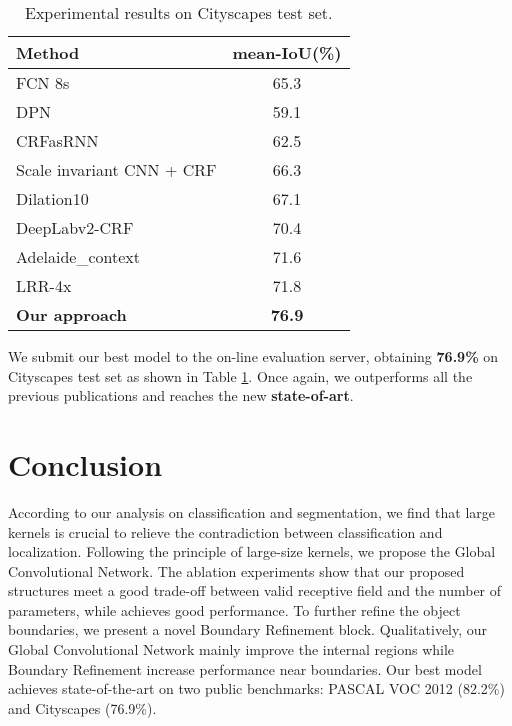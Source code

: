 \documentclass[10pt,twocolumn,letterpaper]{article}
\begin{document}
      \begin{table}[t]
      \begin{center}
         \begin{tabular}{l|c}
            \hline
            Method & mean-IoU(\%) \\
            \hline
            FCN 8s \cite{shelhamer2016fully} & 65.3 \\
            \hline
            DPN \cite{liu2015semantic} & 59.1 \\
            CRFasRNN \cite{zheng2015conditional} & 62.5 \\
            Scale invariant CNN + CRF \cite{krevso2016convolutional} & 66.3 \\
            Dilation10 \cite{yu2015multi} &  67.1 \\
            DeepLabv2-CRF \cite{chen2016deeplab} & 70.4 \\
            Adelaide\_context \cite{Lin_2016_CVPR} & 71.6 \\
            LRR-4x \cite{ghiasi2016laplacian} & 71.8   \\
            \hline 
            \textbf{Our approach} & \textbf{76.9}\\
            \hline
         \end{tabular}
      \end{center}
      \caption{Experimental results on Cityscapes test set. }
      \label{table:cityscapes-train-test}
   \end{table}

\par
   We submit our best model to the on-line evaluation server, obtaining \textbf{76.9\%} on Cityscapes test set as shown in Table \ref{table:cityscapes-train-test}. Once again, we outperforms all the previous publications and reaches the new \textbf{state-of-art}.
\section{Conclusion}
   According to our analysis on classification and segmentation, we find that large kernels is crucial to relieve the contradiction between classification and localization. Following the principle of large-size kernels, we propose the Global Convolutional Network. The ablation experiments show that our proposed structures meet a good trade-off between valid receptive field and the number of parameters, while achieves good performance. To further refine the object boundaries, we present a novel Boundary Refinement block. Qualitatively, our Global Convolutional Network mainly improve the internal regions while Boundary Refinement increase performance near boundaries. Our best model achieves state-of-the-art on two public benchmarks: PASCAL VOC 2012 (82.2\%) and Cityscapes (76.9\%). 
{\small


}
\clearpage
\appendix
   \onecolumn
\end{document}
